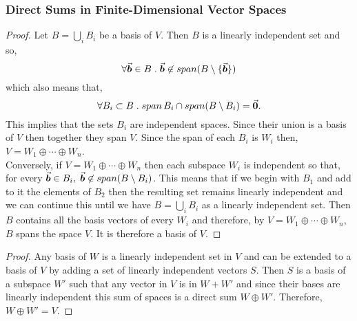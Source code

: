 \documentclass[MathsNotesBase.tex]{subfiles}
\begin{document}
{	\bigskip
	\subsubsection{Direct Sums in Finite-Dimensional Vector Spaces}
	\medskip
	\begin{proof}
		Let ${ B = \bigcup_i B_i }$ be a basis of $V$. Then $B$ is a linearly independent set and so,
		\[ \forall \vec{\bm{b}} \in B \;.\; \vec{\bm{b}} \not\in span(B \setminus \{\vec{\bm{b}}\}) \]
		which also means that,
		\[ \forall B_i \subset B \;.\; span\,B_i \cap span(B \setminus B_i) = \vec{\bm{0}}. \]
		This implies that the sets $B_i$ are independent spaces. Since their union is a basis of $V$ then together they span $V$. Since the span of each $B_i$ is $W_i$ then, ${ V = W_1 \oplus \cdots \oplus W_n }$.\\
		Conversely, if ${ V = W_1 \oplus \cdots \oplus W_n }$ then each subspace $W_i$ is independent so that, for every ${ \vec{\bm{b}} \in B_i,\; \vec{\bm{b}} \not\in span(B \setminus B_i) }$. This means that if we begin with $B_1$ and add to it the elements of $B_2$ then the resulting set remains linearly independent and we can continue this until we have ${ B = \bigcup_i B_i }$ as a linearly independent set. Then $B$ contains all the basis vectors of every $W_i$ and therefore, by ${ V = W_1 \oplus \cdots \oplus W_n }$, $B$ spans the space $V$. It is therefore a basis of $V$.
	\end{proof}

	\medskip
	\begin{proof}
		Any basis of $W$ is a linearly independent set in $V$ and can be extended to a basis of $V$ by adding a set of linearly independent vectors $S$. Then $S$ is a basis of a subspace $W'$ such that any vector in $V$ is in ${ W + W' }$ and since their bases are linearly independent this sum of spaces is a direct sum ${ W \oplus W' }$. Therefore, ${ W \oplus W' = V }$.
	\end{proof}
}
\end{document}
